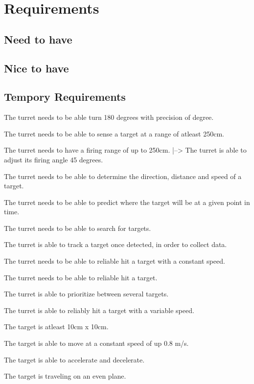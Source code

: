 \section{Requirements}

\subsection{Need to have}


\subsection{Nice to have}



\subsection{Tempory Requirements}
The turret needs to be able turn 180 degrees with precision of  degree.

The turret needs to be able to sense a target at a range of atleast 250cm.

The turret needs to have a firing range of up to 250cm.
|--> The turret is able to adjust its firing angle 45 degrees.

The turret needs to be able to determine the direction, distance and speed of a target.

The turret needs to be able to predict where the target will be at a given point in time.

The turret needs to be able to search for targets.

The turret is able to track a target once detected, in order to collect data.

The turret needs to be able to reliable hit a target with a constant speed.

The turret needs to be able to reliable hit 
a target.

The turret is able to prioritize between several targets.

The turret is able to reliably hit a target with a variable speed.

The target is atleast 10cm x 10cm.\nl

The target is able to move at a constant speed of up 0.8 m/s.\nl

The target is able to accelerate and decelerate.\nl

The target is traveling on an even plane.\nl
